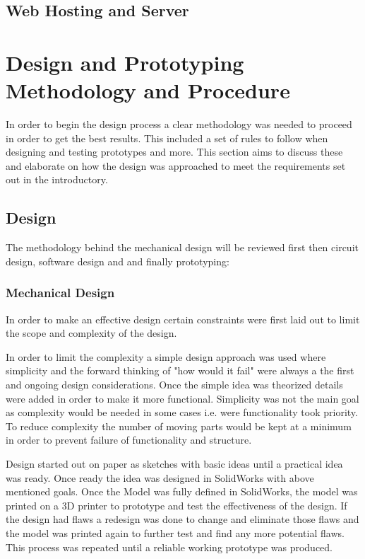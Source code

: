\documentclass[a4paper,11pt]{article}
\numberwithin{figure}{section}
\begin{document}
\subsection{Web Hosting and Server}



	\newpage

\section{Design and Prototyping Methodology and Procedure}
	In order to begin the design process a clear methodology was needed to proceed in order to get the best results. This included a set of rules to follow when designing and testing prototypes and more. This section aims to discuss these and elaborate on how the design was approached to meet the requirements set out in the introductory.

\subsection{Design}
The methodology behind the mechanical design will be reviewed first then circuit design, software design and and finally prototyping:
\subsubsection{Mechanical Design}
In order to make an effective design certain constraints were first laid out to limit the scope and complexity of the design.

In order to limit the complexity a simple design approach was used where simplicity and the forward thinking of "how would it fail" were always a the first and ongoing design considerations. Once the simple idea was theorized details were added in order to make it more functional. Simplicity was not the main goal as complexity would be needed in some cases i.e. were functionality took priority. To reduce complexity the number of moving parts would be kept at a minimum in order to prevent failure of functionality and structure. 

Design started out on paper as sketches with basic ideas until a practical idea was ready. Once ready the idea was designed in SolidWorks with above mentioned goals. Once the Model was fully defined in SolidWorks, the model was printed on a 3D printer to prototype and test the effectiveness of the design. If the design had flaws a redesign was done to change and eliminate those flaws and the model was printed again to further test and find any more potential flaws. This process was repeated until a reliable working prototype was produced.
\end{document}
